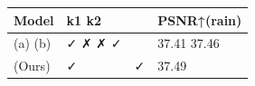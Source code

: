 \begin{tabular}{llll}
\toprule
Model & k1 k2 &  & PSNR↑(rain) \\
\midrule
(a) (b) & ✓ ✗ ✗ ✓ &  & 37.41 37.46 \\
(Ours) & ✓ & ✓ & 37.49 \\
\bottomrule
\end{tabular}
